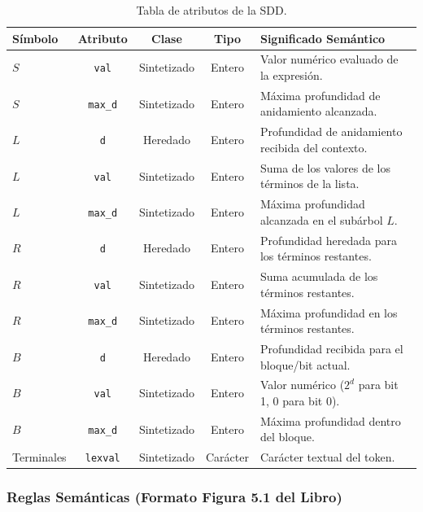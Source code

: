 \documentclass[11pt,a4paper]{article}
\begin{document}
\begin{table}[h!]
\centering
\begin{tabular}{lcccl}
\toprule
\textbf{Símbolo} & \textbf{Atributo} & \textbf{Clase} & \textbf{Tipo} & \textbf{Significado Semántico} \\
\midrule
$S$ & \texttt{val} & Sintetizado & Entero & Valor numérico evaluado de la expresión. \\
$S$ & \texttt{max\_d} & Sintetizado & Entero & Máxima profundidad de anidamiento alcanzada. \\
$L$ & \texttt{d} & Heredado & Entero & Profundidad de anidamiento recibida del contexto. \\
$L$ & \texttt{val} & Sintetizado & Entero & Suma de los valores de los términos de la lista. \\
$L$ & \texttt{max\_d} & Sintetizado & Entero & Máxima profundidad alcanzada en el subárbol $L$. \\
$R$ & \texttt{d} & Heredado & Entero & Profundidad heredada para los términos restantes. \\
$R$ & \texttt{val} & Sintetizado & Entero & Suma acumulada de los términos restantes. \\
$R$ & \texttt{max\_d} & Sintetizado & Entero & Máxima profundidad en los términos restantes. \\
$B$ & \texttt{d} & Heredado & Entero & Profundidad recibida para el bloque/bit actual. \\
$B$ & \texttt{val} & Sintetizado & Entero & Valor numérico ($2^d$ para bit 1, 0 para bit 0). \\
$B$ & \texttt{max\_d} & Sintetizado & Entero & Máxima profundidad dentro del bloque. \\
Terminales & \texttt{lexval} & Sintetizado & Carácter & Carácter textual del token. \\
\bottomrule
\end{tabular}
\caption{Tabla de atributos de la SDD.}
\end{table}

\subsubsection{Reglas Semánticas (Formato Figura 5.1 del Libro)}
\end{document}
